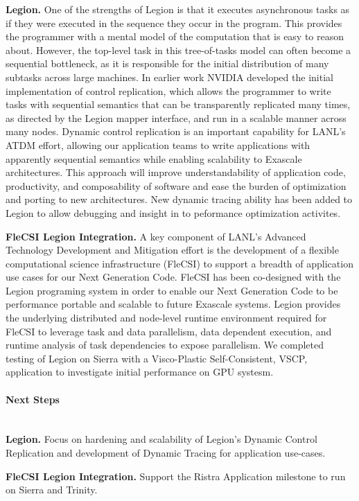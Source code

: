 \textbf{Legion.} 
One of the strengths of Legion is that it executes asynchronous tasks as if they were executed in the sequence they occur in the program. This provides the programmer with a mental model of the computation that is easy to reason about. However, the top-level task in this tree-of-tasks model can often become a sequential bottleneck, as it is responsible for the initial distribution of many subtasks across large machines. In earlier work NVIDIA developed the initial implementation of control replication, which allows the programmer to write tasks with sequential semantics that can be  transparently replicated many times, as directed by the Legion mapper interface, and run in a scalable manner across many nodes.
Dynamic control replication is an important capability for LANL's ATDM effort, allowing our application teams to write applications with apparently sequential semantics while enabling scalability to Exascale architectures. This approach will improve understandability of application code, productivity, and composability of software and ease the burden of optimization and porting to new architectures. 
New dynamic tracing ability has been added to Legion to allow debugging and insight in to peformance optimization activites.

\textbf{FleCSI Legion Integration.} A key component of LANL's Advanced Technology  Development and Mitigation effort is the development of a flexible computational science infrastructure (FleCSI) to support a breadth of application use cases for our Next Generation Code. FleCSI has been co-designed with the Legion programing system in order to enable our Next Generation Code to be performance portable and scalable to future Exascale systems. Legion provides the underlying distributed and node-level runtime environment required for FleCSI to leverage task and data parallelism, data dependent execution, and runtime analysis of task dependencies to expose parallelism. We completed testing of Legion on Sierra with a Visco-Plastic Self-Consistent, VSCP, application to investigate initial performance on GPU systesm.



\paragraph{Next Steps}  \leavevmode \\


\textbf{Legion.} Focus on hardening and scalability of Legion's Dynamic Control Replication and development of Dynamic Tracing for application use-cases. 

\textbf{FleCSI Legion Integration.} Support the Ristra Application milestone to run on Sierra and Trinity.

